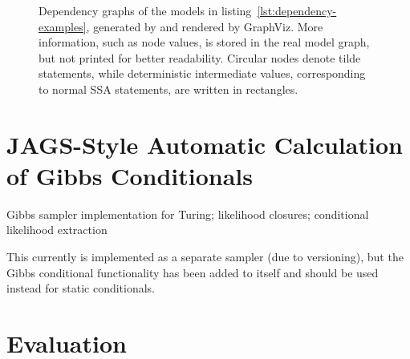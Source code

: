 \begin{figure}[p]
  \caption{Dependency graphs of the models in listing~\ref{lst:dependency-examples}, generated by
    \autogibbsjl{} and rendered by GraphViz.  More information, such as node values, is stored in
    the real model graph, but not printed for better readability.  Circular nodes denote tilde
    statements, while deterministic intermediate values, corresponding to normal SSA statements, are
    written in rectangles.}
  \label{fig:geom-deps}
\end{figure}


\section{JAGS-Style Automatic Calculation of Gibbs Conditionals}
\label{sec:jags-style-conditionals}

Gibbs sampler implementation for Turing; likelihood closures; conditional likelihood extraction

This currently is implemented as a separate sampler (due to versioning), but the Gibbs conditional
functionality has been added to \turingjl{} itself and should be used instead for static
conditionals.


\section{Evaluation}
\label{sec:autogibbs-eval}

